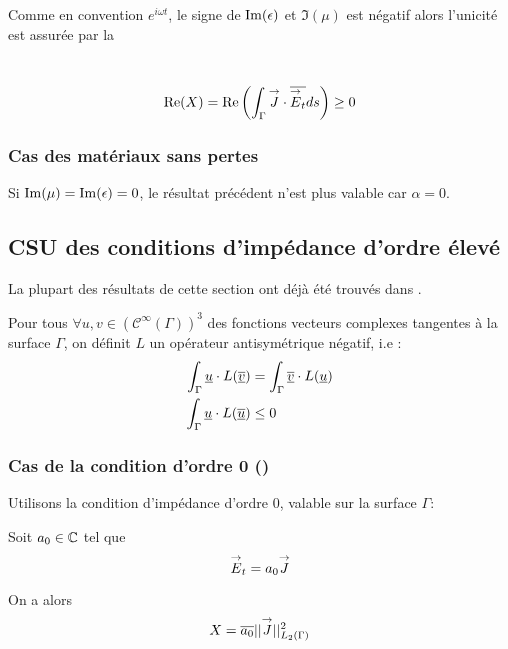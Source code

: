 Comme en convention $e^{i\omega t}$, le signe de $\operatorname{Im}(\epsilon)$ et $\Im(\mu)$ est négatif
alors l'unicité est assurée par la
\begin{defn}~\\
\begin{equation}\label{eq:unicite:form_var:cgu}
\operatorname{Re}(X) = \operatorname{Re}\left(\int_\Gamma {\overset{\rightarrow}{J}} \cdot {\overline{{\overset{\rightarrow}{E}}_t}} ds\right) \ge 0
\end{equation}
\end{defn}

\subsubsection{Cas des matériaux sans pertes}

Si $\operatorname{Im}(\mu) = \operatorname{Im}(\epsilon) = 0$, le résultat précédent n'est plus valable car $\alpha = 0$.


\subsection{CSU des conditions d'impédance d'ordre élevé}

La plupart des résultats de cette section ont déjà été trouvés dans \cite{stupfel_sufficient_2011}.


Pour tous $\forall u, v \in (\mathcal C^\infty(\Gamma))^3$ des fonctions vecteurs complexes tangentes à la surface $\Gamma$, on définit $L$ un opérateur antisymétrique négatif, i.e : 
\begin{align*}
\int_\Gamma \underline{u}\cdot L({\overline{\underline{v}}}) &= \int_\Gamma {\overline{\underline{v}}}\cdot L(\underline{u})\\
\int_\Gamma \underline{u}\cdot L({\overline{\underline{u}}}) &\le 0
\end{align*}

\subsubsection{Cas de la condition d'ordre 0 (\cite{stupfel_sufficient_2011})}
Utilisons la condition d’impédance d'ordre 0, valable sur la surface $\Gamma$: 

Soit $a_0 \in \mathbb C$ tel que
\[
{\overset{\rightarrow}{E}}_t = a_0 {\overset{\rightarrow}{J}}
\]

On a alors
\begin{equation*}
X = {\overline{a_0}}||{\overset{\rightarrow}{J}}||_{L_2(\Gamma)}^2
\end{equation*}

